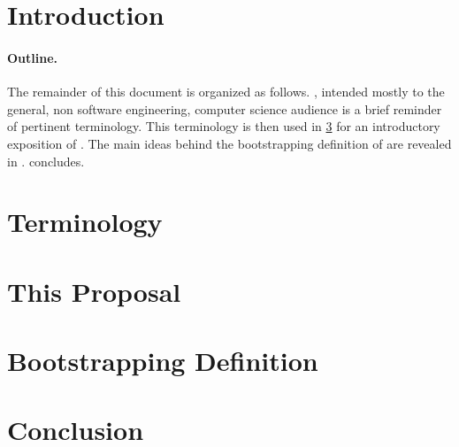 \documentclass[a4paper,USenglish]{lipics}
\author{Anonymized for the submission}
\begin{document}
\maketitle
\begin{abstract}
	 
\end{abstract}
\section{Introduction}

\paragraph{Outline.} 
The remainder of this document is organized as follows.
, intended mostly to the general, non software engineering, 
  computer science audience is a brief reminder of pertinent terminology.
This terminology is then used in \cref{Section:proposal} for 
  an introductory exposition of \Self.
The main ideas behind the bootstrapping definition of \Self 
  are revealed in . 
 concludes. 

\section{Terminology}
\label{Section:terminology}


\section{This Proposal}
\label{Section:proposal}


\section{Bootstrapping Definition}
\label{Section:bootstrapping}


\section{Conclusion}
\label{Section:zz}


\small
%

\end{document}
